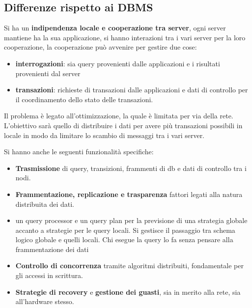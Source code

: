 \subsection{Differenze rispetto ai DBMS}
Si ha un \textbf{indipendenza locale e cooperazione tra server}, ogni server
mantiene ha la sua applicazione, si hanno interazioni tra i vari server per la
loro cooperazione, la cooperazione può avvenire per gestire due cose:
\begin{itemize}
      \item \textbf{interrogazioni}: sia query provenienti dalle applicazioni e
            i risultati provenienti dal server
      \item \textbf{transazioni}: richieste di transazioni dalle applicazioni  e
            dati di controllo per il coordinamento dello stato delle transazioni.
\end{itemize}
Il problema è legato all'ottimizzazione, la quale è limitata per via della rete. 
L'obiettivo sarà quello di distribuire i dati per avere più transazioni possibili 
in locale in modo da limitare lo scambio di messaggi tra i vari server.

Si hanno anche le seguenti funzionalità specifiche:
\begin{itemize}
      \item \textbf{Trasmissione} di query, transizioni, frammenti di db e dati
            di controllo tra i nodi.
      \item \textbf{Frammentazione, replicazione e trasparenza} fattori legati
            alla natura distribuita dei dati.
      \item un query processor e un query plan per la previsione di una
            strategia globale accanto a strategie per le query locali. Si gestisce
            il passaggio tra schema logico globale e quelli locali. Chi esegue
            la query lo fa senza pensare alla frammentazione dei dati
      \item \textbf{Controllo di concorrenza} tramite algoritmi distribuiti, fondamentale
            per gli accessi in scrittura.
      \item \textbf{Strategie di recovery} e \textbf{gestione dei guasti}, sia
            in merito alla rete, sia all'hardware stesso.
\end{itemize}

